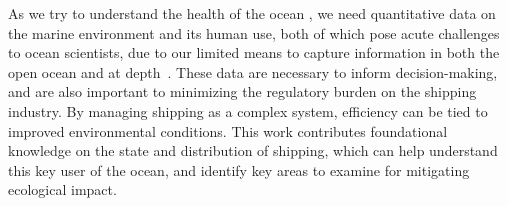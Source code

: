 


As we try to understand the health of the ocean \citep{Halpern2012}, we need quantitative data on the marine environment and its human use, both of which pose acute challenges to ocean scientists, due to our limited means to capture information in both the open ocean and at depth~\citep{Wright1997}. These data are necessary to inform decision-making, and are also important to minimizing the regulatory burden on the shipping industry. By managing shipping as a complex system, efficiency can be tied to improved environmental conditions. This work contributes foundational knowledge on the state and distribution of shipping, which can help understand this key user of the ocean, and identify key areas to examine for mitigating ecological impact.






